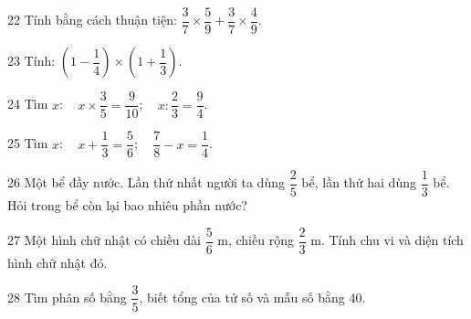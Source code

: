 \gap
\begin{probbox}{22}{\relax}
Tính bằng cách thuận tiện: $\dfrac37\times\dfrac59+\dfrac37\times\dfrac49$.
\end{probbox}
\gap
\begin{probbox}{23}{\relax}
Tính: $\left(1-\dfrac14\right)\times\left(1+\dfrac13\right)$.
\end{probbox}
\gap
\begin{probbox}{24}{\relax}
Tìm $x$: \  $x\times\dfrac35=\dfrac9{10}$; \  $x:\dfrac23=\dfrac94$.
\end{probbox}
\gap
\begin{probbox}{25}{\relax}
Tìm $x$: \  $x+\dfrac13=\dfrac56$; \  $\dfrac78-x=\dfrac14$.
\end{probbox}
\gap
\begin{probbox}{26}{\relax}
Một bể đầy nước. Lần thứ nhất người ta dùng $\dfrac25$ bể, lần thứ hai dùng $\dfrac13$ bể. Hỏi trong bể còn lại bao nhiêu phần nước?
\end{probbox}
\gap
\begin{probbox}{27}{\relax}
Một hình chữ nhật có chiều dài $\dfrac56$ m, chiều rộng $\dfrac23$ m. Tính chu vi và diện tích hình chữ nhật đó.
\end{probbox}
\gap
\begin{probbox}{28}{\relax}
Tìm phân số bằng $\dfrac35$, biết tổng của tử số và mẫu số bằng $40$.
\end{probbox}
